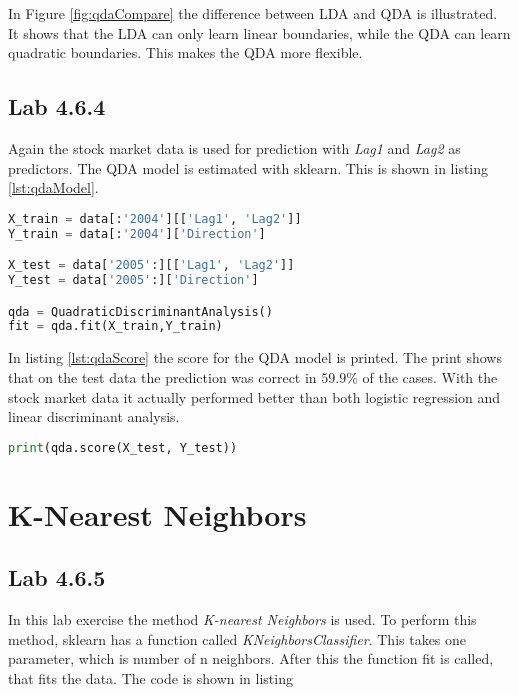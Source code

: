 
In Figure \ref{fig:qdaCompare} the difference between LDA and QDA is illustrated. It shows that the LDA can only learn linear boundaries, while the QDA can learn quadratic boundaries. This makes the QDA more flexible. 

\subsection{Lab 4.6.4}
Again the stock market data is used for prediction with \emph{Lag1} and \emph{Lag2} as predictors. The QDA model is estimated with sklearn. This is shown in listing \ref{lst:qdaModel}.

\begin{lstlisting}[language=Python, label=lst:qdaModel, caption=Creating quadratic discriminant analysis model sklearn]
X_train = data[:'2004'][['Lag1', 'Lag2']]
Y_train = data[:'2004']['Direction']

X_test = data['2005':][['Lag1', 'Lag2']]
Y_test = data['2005':]['Direction']

qda = QuadraticDiscriminantAnalysis()
fit = qda.fit(X_train,Y_train)
\end{lstlisting}

In listing \ref{lst:qdaScore} the score for the QDA model is printed. The print shows that on the test data the prediction was correct in $59.9\%$ of the cases. With the stock market data it actually performed better than both logistic regression and linear discriminant analysis. 
\begin{lstlisting}[language=Python, label=lst:qdaScore, caption=Printing qda score]
print(qda.score(X_test, Y_test))
\end{lstlisting}

\section{K-Nearest Neighbors}

\subsection{Lab 4.6.5}

In this lab exercise the method \emph{K-nearest Neighbors} is used. To perform this method, sklearn has a function called \emph{KNeighborsClassifier}. This takes one parameter, which is number of n neighbors. After this the function fit is called, that fits the data.
The code is shown in listing

